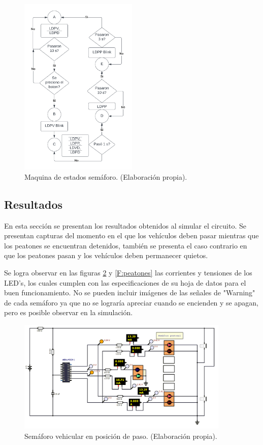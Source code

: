 \documentclass[12pt,letterpaper]{article}     %
\begin{document}
\begin{figure}[H]
    \centering
    \includegraphics[width=0.5\textwidth]{imagenes/maquina de estados.png}
    \caption{Maquina de estados semáforo. (Elaboración propia).}
    \label{F:maquina de estados}
\end{figure}




\subsection{Resultados}
En esta sección se presentan los resultados obtenidos al simular el circuito. Se presentan capturas del momento en el que los vehículos deben pasar mientras que los peatones se encuentran detenidos, también se presenta el caso contrario en que los peatones pasan y los vehículos deben permanecer quietos.

Se logra observar en las figuras \ref{F:vehiculos} y \ref{F:peatones} las corrientes y tensiones de los LED's, los cuales cumplen con las especificaciones de su hoja de datos para el buen funcionamiento. No se pueden incluir imágenes de las señales de "Warning" de cada semáforo ya que no se lograría apreciar cuando se encienden y se apagan, pero es posible observar en la simulación.
\begin{figure}[H]
    \centering
    \includegraphics[width=0.9\textwidth]{imagenes/paso vehiculos.jpeg}
    \caption{Semáforo vehicular en posición de paso. (Elaboración propia).}
    \label{F:vehiculos}
\end{figure}
\end{document}
